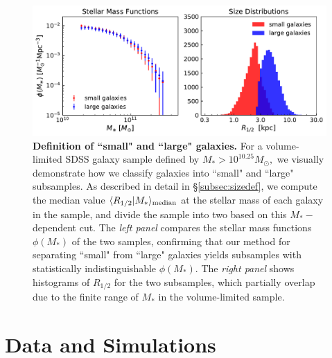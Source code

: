 \documentclass[usenatbib,usegraphicx,letterpaper]{mn2e}
\newcommand{\rhalf}{R_{1/2}}
\newcommand{\mstar}{M_{\ast}}
\newcommand{\median}[2]{\langle{#1}\vert{#2}\rangle_{\rm median}}
\begin{document}
\begin{figure}
\centering
\includegraphics[width=\textwidth]{FIGS/sdss_small_large_sample_definitions.pdf}
\caption{
{\bf Definition of ``small" and ``large" galaxies.} For a volume-limited SDSS galaxy sample defined by $M_{\ast}>10^{10.25}M_{\odot},$ we visually demonstrate how we classify galaxies into ``small" and ``large" subsamples. As described in detail in \S\ref{subsec:sizedef}, we compute the median value $\median{\rhalf}{\mstar}$ at the stellar mass of each galaxy in the sample, and divide the sample into two based on this $\mstar-$dependent cut. The {\em left panel} compares the stellar mass functions $\phi(\mstar)$ of the two samples, confirming that our method for separating ``small" from ``large" galaxies yields subsamples with statistically indistinguishable $\phi(\mstar)$. The {\em right panel} shows histograms of $\rhalf$ for the two subsamples, which partially overlap due to the finite range of $\mstar$ in the volume-limited sample.
}
\label{fig:sizedefinition}
\end{figure}

\section{Data and Simulations}
\label{sec:data}
\end{document}
